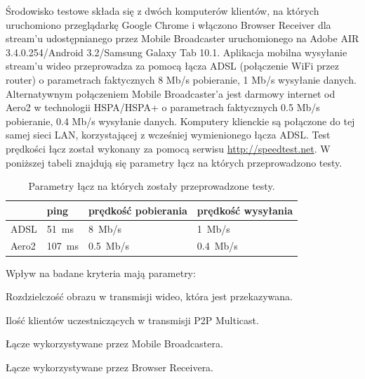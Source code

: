 Środowisko testowe składa się z dwóch komputerów klientów, na których uruchomiono przeglądarkę Google Chrome i włączono Browser Receiver dla stream'u udostępnianego przez Mobile Broadcaster uruchomionego na Adobe AIR 3.4.0.254/Android 3.2/Samsung Galaxy Tab 10.1. Aplikacja mobilna wysyłanie stream'u wideo przeprowadza za pomocą łącza ADSL (połączenie WiFi przez router) o parametrach faktycznych 8 Mb/s pobieranie, 1 Mb/s wysyłanie danych. Alternatywnym połączeniem Mobile Broadcaster'a jest darmowy internet od Aero2 w technologii HSPA/HSPA+ o parametrach faktycznych 0.5 Mb/s pobieranie, 0.4 Mb/s wysyłanie danych. Komputery klienckie są połączone do tej samej sieci LAN, korzystającej z wcześniej wymienionego łącza ADSL. Test prędkości łącz został wykonany za pomocą serwisu \url{http://speedtest.net}. W poniższej tabeli znajdują się parametry łącz na których przeprowadzono testy.

\begin{table}[h]
    \centering
    \begin{tabular}{|l|l|l|l|}
        \hline
        & ping & prędkość pobierania & prędkość wysyłania \\
        \hline
        ADSL
        &
        51~ms
        &
        8~Mb/s
        &
        1~Mb/s
        \\
        \hline
        Aero2
        &
        107~ms
        &
        0.5~Mb/s
        &
        0.4~Mb/s
        \\
        \hline
    \end{tabular}
    \caption{Parametry łącz na których zostały przeprowadzone testy.}
\end{table}

Wpływ na badane kryteria mają parametry:
\begin{packed_item}
    \item{Rozdzielczość obrazu w transmisji wideo, która jest przekazywana.}
    \item{Ilość klientów uczestniczących w transmisji P2P Multicast.}
    \item{Łącze wykorzystywane przez Mobile Broadcastera.}
    \item{Łącze wykorzystywane przez Browser Receivera.}
\end{packed_item}

